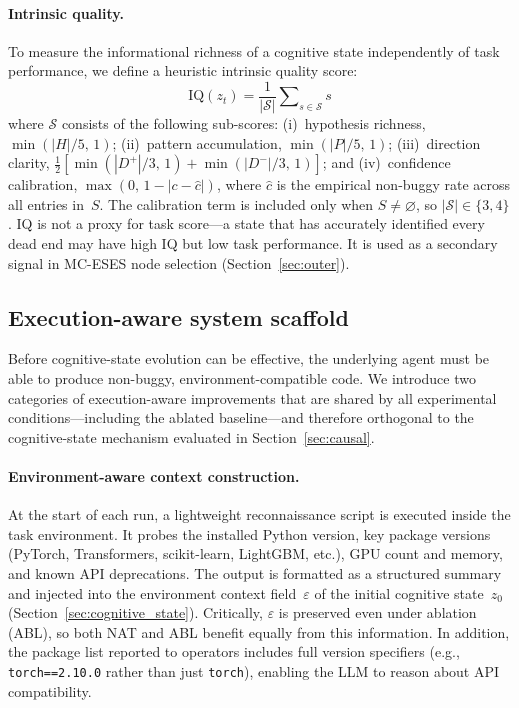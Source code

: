 \documentclass{article} %
\newcommand{\zt}{z_t}
\begin{document}
\paragraph{Intrinsic quality.}
To measure the informational richness of a cognitive state independently of
task performance, we define a heuristic intrinsic quality score:
\begin{equation}
  \text{IQ}(\zt) = \frac{1}{|\mathcal{S}|}
  \sum\nolimits_{s \in \mathcal{S}} s
  \label{eq:iq}
\end{equation}
where $\mathcal{S}$ consists of the following sub-scores:
(i)~hypothesis richness, $\min(|H|/5,\, 1)$;
(ii)~pattern accumulation, $\min(|P|/5,\, 1)$;
(iii)~direction clarity,
$\tfrac{1}{2}[\min(|D^{+}|/3,\, 1) + \min(|D^{-}|/3,\, 1)]$;
and (iv)~confidence calibration, $\max(0,\, 1 - |c - \hat{c}|)$,
where $\hat{c}$ is the empirical non-buggy rate across all entries in~$S$.
The calibration term is included only when $S \neq \varnothing$, so
$|\mathcal{S}| \in \{3, 4\}$.
IQ is not a proxy for task score---a state that has accurately identified every
dead end may have high IQ but low task performance.
It is used as a secondary signal in MC-ESES node selection
(Section~\ref{sec:outer}).


\subsection{Execution-aware system scaffold}
\label{sec:scaffold}

Before cognitive-state evolution can be effective, the underlying agent must
be able to produce non-buggy, environment-compatible code. We introduce two
categories of execution-aware improvements that are shared by all experimental
conditions---including the ablated baseline---and therefore orthogonal to the
cognitive-state mechanism evaluated in Section~\ref{sec:causal}.

\paragraph{Environment-aware context construction.}
At the start of each run, a lightweight reconnaissance script is executed
inside the task environment. It probes the installed Python version, key
package versions (PyTorch, Transformers, scikit-learn, LightGBM, etc.), GPU
count and memory, and known API deprecations. The output is formatted as a
structured summary and injected into the environment context
field~$\varepsilon$ of the initial cognitive state~$z_0$
(Section~\ref{sec:cognitive_state}). Critically, $\varepsilon$ is preserved
even under ablation (ABL), so both NAT and ABL benefit equally from this
information. In addition, the package list reported to operators includes full
version specifiers (e.g., \texttt{torch==2.10.0} rather than just
\texttt{torch}), enabling the LLM to reason about API compatibility.
\end{document}
